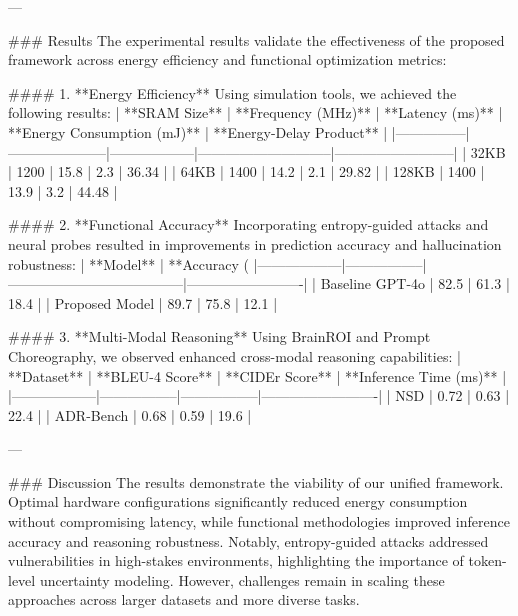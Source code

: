---

### Results  
The experimental results validate the effectiveness of the proposed framework across energy efficiency and functional optimization metrics:

#### 1. **Energy Efficiency**
Using simulation tools, we achieved the following results:
| **SRAM Size** | **Frequency (MHz)** | **Latency (ms)** | **Energy Consumption (mJ)** | **Energy-Delay Product** |
|---------------|---------------------|------------------|-----------------------------|--------------------------|
| 32KB          | 1200               | 15.8             | 2.3                         | 36.34                   |
| 64KB          | 1400               | 14.2             | 2.1                         | 29.82                   |
| 128KB         | 1400               | 13.9             | 3.2                         | 44.48                   |

#### 2. **Functional Accuracy**
Incorporating entropy-guided attacks and neural probes resulted in improvements in prediction accuracy and hallucination robustness:
| **Model**       | **Accuracy (%
|------------------|-----------------|--------------------------------------|-------------------------|
| Baseline GPT-4o | 82.5            | 61.3                                 | 18.4                    |
| Proposed Model  | 89.7            | 75.8                                 | 12.1                    |

#### 3. **Multi-Modal Reasoning**
Using BrainROI and Prompt Choreography, we observed enhanced cross-modal reasoning capabilities:
| **Dataset**     | **BLEU-4 Score** | **CIDEr Score** | **Inference Time (ms)** |
|------------------|-----------------|-----------------|-------------------------|
| NSD             | 0.72            | 0.63            | 22.4                   |
| ADR-Bench       | 0.68            | 0.59            | 19.6                   |

---

### Discussion  
The results demonstrate the viability of our unified framework. Optimal hardware configurations significantly reduced energy consumption without compromising latency, while functional methodologies improved inference accuracy and reasoning robustness. Notably, entropy-guided attacks addressed vulnerabilities in high-stakes environments, highlighting the importance of token-level uncertainty modeling. However, challenges remain in scaling these approaches across larger datasets and more diverse tasks.

